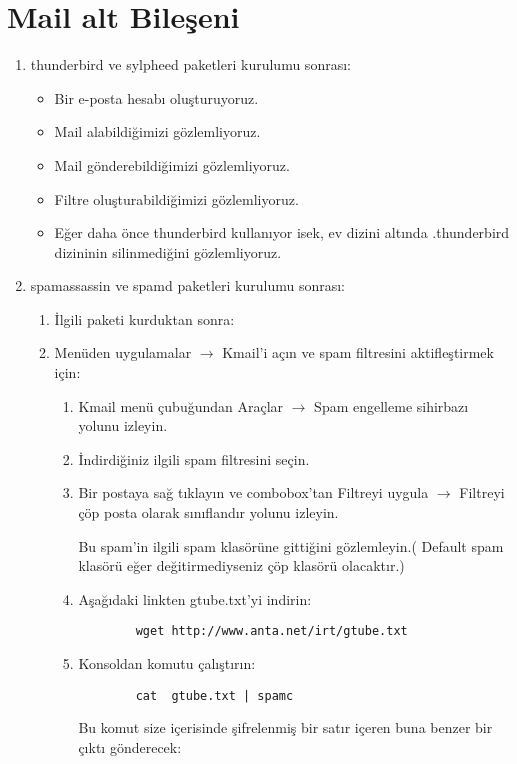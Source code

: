 \documentclass[a4paper,10pt]{article}
\begin{document}
\section{Mail alt Bileşeni}
\begin{enumerate}
 \item thunderbird ve sylpheed paketleri kurulumu sonrası:
\begin{itemize}
\item Bir e-posta hesabı oluşturuyoruz.
\item Mail alabildiğimizi gözlemliyoruz.
\item Mail gönderebildiğimizi gözlemliyoruz.
\item Filtre oluşturabildiğimizi gözlemliyoruz.
\item Eğer daha önce thunderbird kullanıyor isek, ev dizini altında .thunderbird dizininin silinmediğini gözlemliyoruz.
\end{itemize}
 \item spamassassin ve spamd paketleri kurulumu sonrası:
\begin{enumerate}
	\item İlgili paketi kurduktan sonra:
	\item Menüden uygulamalar $\rightarrow$ Kmail'i açın ve spam filtresini aktifleştirmek için:
		
	\begin{enumerate}
		\item Kmail menü çubuğundan Araçlar $\rightarrow$  Spam engelleme sihirbazı yolunu izleyin.
		\item İndirdiğiniz ilgili spam filtresini seçin.
		\item Bir postaya sağ tıklayın ve combobox'tan Filtreyi uygula $\rightarrow$ Filtreyi çöp posta olarak sınıflandır yolunu izleyin.

		Bu spam'in ilgili spam klasörüne gittiğini gözlemleyin.( Default spam klasörü eğer değitirmediyseniz çöp klasörü olacaktır.)

		\item Aşağıdaki linkten gtube.txt'yi indirin: 
		\begin{verbatim}
 		wget http://www.anta.net/irt/gtube.txt
		\end{verbatim}
		\item  Konsoldan komutu çalıştırın:
		\begin{verbatim}
 		cat  gtube.txt | spamc 
		\end{verbatim}
		
		Bu komut size içerisinde şifrelenmiş bir satır içeren buna benzer bir çıktı gönderecek:
		

\end{enumerate}
\end{enumerate}
\end{enumerate}
\end{document}

